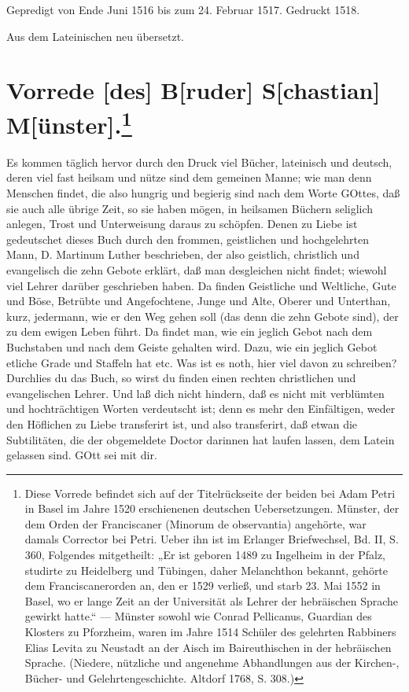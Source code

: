 Gepredigt von Ende Juni 1516 bis zum 24. Februar 1517. Gedruckt 1518.

Aus dem Lateinischen neu übersetzt.

\section[{Vorrede [des] B[ruder] S[chastian] M[ünster]}]{Vorrede [des] B[ruder] S[chastian] M[ünster].\footnote{Diese Vorrede befindet sich auf der Titelrückseite der beiden bei Adam Petri in Basel im Jahre 1520 erschienenen deutschen Uebersetzungen. Münster, der dem Orden der Franciscaner (Minorum de observantia) angehörte, war damals Corrector bei Petri. Ueber ihn ist im Erlanger Briefwechsel, Bd. II, S. 360, Folgendes mitgetheilt: „Er ist geboren 1489 zu Ingelheim in der Pfalz, studirte zu Heidelberg und Tübingen, daher Melanchthon bekannt, gehörte dem Franciscanerorden an, den er 1529 verließ, und starb 23. Mai 1552 in Basel, wo er lange Zeit an der Universität als Lehrer der hebräischen Sprache gewirkt hatte.“ — Münster sowohl wie Conrad Pellicanus, Guardian des Klosters zu Pforzheim, waren im Jahre 1514 Schüler des gelehrten Rabbiners Elias Levita zu Neustadt an der Aisch im Baireuthischen in der hebräischen Sprache. (Niedere, nützliche und angenehme Abhandlungen aus der Kirchen-, Bücher- und Gelehrtengeschichte. Altdorf 1768, S. 308.)}}

Es kommen täglich hervor durch den Druck viel Bücher, lateinisch und deutsch, deren viel fast heilsam und nütze sind dem gemeinen Manne; wie man denn Menschen findet, die also hungrig und begierig sind nach dem Worte GOttes, daß sie auch alle übrige Zeit, so sie haben mögen, in heilsamen Büchern seliglich anlegen, Trost und Unterweisung daraus zu schöpfen. Denen zu Liebe ist gedeutschet dieses Buch durch den frommen, geistlichen und hochgelehrten Mann, D. Martinum Luther beschrieben, der also geistlich, christlich und evangelisch die zehn Gebote erklärt, daß man desgleichen nicht findet; wiewohl viel Lehrer darüber geschrieben haben. Da finden Geistliche und Weltliche, Gute und Böse, Betrübte und Angefochtene, Junge und Alte, Oberer und Unterthan, kurz, jedermann, wie er den Weg gehen soll (das denn die zehn Gebote sind), der zu dem ewigen Leben führt. Da findet man, wie ein jeglich Gebot nach dem Buchstaben und nach dem Geiste gehalten wird. Dazu, wie ein jeglich Gebot etliche Grade und Staffeln hat etc. Was ist es noth, hier viel davon zu schreiben? Durchlies du das Buch, so wirst du finden einen rechten christlichen und evangelischen Lehrer. Und laß dich nicht hindern, daß es nicht mit verblümten und hochträchtigen Worten verdeutscht ist; denn es mehr den Einfältigen, weder den Höflichen zu Liebe transferirt ist, und also transferirt, daß etwan die Subtilitäten, die der obgemeldete Doctor darinnen hat laufen lassen, dem Latein gelassen sind. GOtt sei mit dir.

